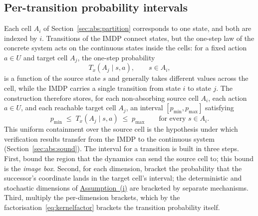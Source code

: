 \documentclass[11pt,a4paper]{article}
\theoremstyle{plain}
\theoremstyle{remark}
\begin{document}
	
	\subsection{Per-transition probability intervals}
	\label{sec:abs:intervals}
	
	Each cell $A_i$ of Section~\ref{sec:abs:partition} corresponds to one state, and both are indexed by $i$. Transitions of the IMDP connect states, but the one-step law of the concrete system acts on the continuous states inside the cells: for a fixed action $a \in U$ and target cell $A_j$, the one-step probability
	\begin{equation}
		T_x(A_j \mid s, a), \qquad s \in A_i,
		\label{eq:txonstates}
	\end{equation}
	is a function of the source state $s$ and generally takes different values across the cell, while the IMDP carries a single transition from state $i$ to state $j$. The construction therefore stores, for each non-absorbing source cell $A_i$, each action $a \in U$, and each reachable target cell $A_j$, an interval $[p_{\min}, p_{\max}]$ satisfying
	\begin{equation}
		p_{\min} \;\le\; T_x(A_j \mid s, a) \;\le\; p_{\max} \qquad \text{for every } s \in A_i.
		\label{eq:cellcontain}
	\end{equation}
	This uniform containment over the source cell is the hypothesis under which verification results transfer from the IMDP to the continuous system~\cite{LAB15} (Section~\ref{sec:abs:sound}). The interval for a transition is built in three steps. First, bound the region that the dynamics can send the source cell to; this bound is the \emph{image box}. Second, for each dimension, bracket the probability that the successor's coordinate lands in the target cell's interval; the deterministic and stochastic dimensions of \hyperref[ass:sysclass]{Assumption~(i)} are bracketed by separate mechanisms. Third, multiply the per-dimension brackets, which by the factorisation~\eqref{eq:kernelfactor} brackets the transition probability itself.
	
\end{document}
